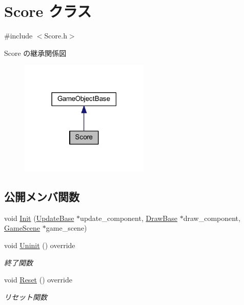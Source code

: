 \hypertarget{class_score}{}\section{Score クラス}
\label{class_score}


{\ttfamily \#include $<$Score.\+h$>$}



Score の継承関係図\nopagebreak
\begin{figure}[H]
\begin{center}
\leavevmode
\includegraphics[width=174pt]{class_score__inherit__graph}
\end{center}
\end{figure}
\subsection*{公開メンバ関数}
\begin{DoxyCompactItemize}
\item 
void \mbox{\hyperlink{class_score_a7d461a8b72ddfd00213858286d702486}{Init}} (\mbox{\hyperlink{class_update_base}{Update\+Base}} $\ast$update\+\_\+component, \mbox{\hyperlink{class_draw_base}{Draw\+Base}} $\ast$draw\+\_\+component, \mbox{\hyperlink{class_game_scene}{Game\+Scene}} $\ast$game\+\_\+scene)
\item 
void \mbox{\hyperlink{class_score_a605e163dc59ccc4d19a3cb6b5db813b8}{Uninit}} () override
\begin{DoxyCompactList}\small\item\em 終了関数 \end{DoxyCompactList}\item 
void \mbox{\hyperlink{class_score_ad01d461a2b6ca345858b2ae0a3d81cc1}{Reset}} () override
\begin{DoxyCompactList}\small\item\em リセット関数 \end{DoxyCompactList}\end{DoxyCompactItemize}

